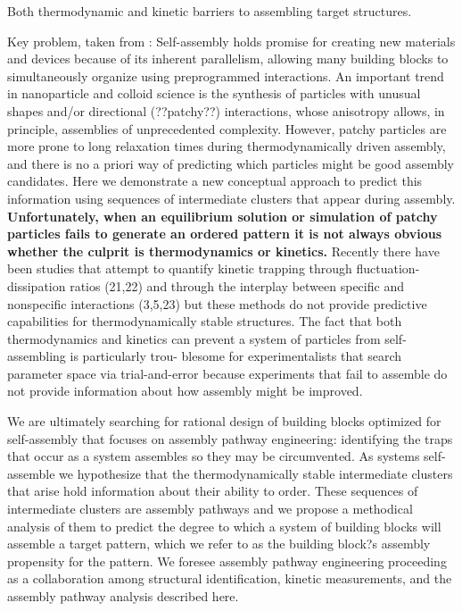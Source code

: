 
Both thermodynamic and kinetic barriers to assembling target structures.

Key problem, taken from \cite{Jankowski_2012_SoftMatter}:
Self-assembly holds promise for creating new materials and devices because of its inherent parallelism, allowing many building blocks to simultaneously organize using preprogrammed interactions.
An important trend in nanoparticle and colloid science is the synthesis of particles with unusual shapes and/or directional (??patchy??) interactions, whose anisotropy allows, in principle, assemblies of unprecedented complexity.
However, patchy particles are more prone to long relaxation times during thermodynamically driven assembly, and there is no a priori way of predicting which particles might be good assembly candidates. 
Here we demonstrate a new conceptual approach to predict this information using sequences of intermediate clusters that appear during assembly.
\textbf{Unfortunately, when an equilibrium solution or simulation of patchy particles fails to generate an ordered pattern it is not always obvious whether the culprit is thermodynamics or kinetics.}
Recently there have been studies that attempt to quantify kinetic trapping through fluctuation-dissipation ratios (21,22) and through the interplay between specific and nonspecific interactions (3,5,23) but these methods do not provide predictive capabilities for thermodynamically stable structures.
The fact that both thermodynamics and kinetics can prevent a system of particles from self-assembling is particularly trou- blesome for experimentalists that search parameter space via trial-and-error because experiments that fail to assemble do not provide information about how assembly might be improved.


We are ultimately searching for rational design of building blocks optimized for self-assembly that focuses on assembly pathway engineering: identifying the traps that occur as a system assembles so they may be circumvented.
As systems self-assemble we hypothesize that the thermodynamically stable intermediate clusters that arise hold information about their ability to order. 
These sequences of intermediate clusters are assembly pathways and we propose a methodical analysis of them to predict the degree to which a system of building blocks will assemble a target pattern, which we refer to as the building block?s assembly propensity for the pattern.
We foresee assembly pathway engineering proceeding as a collaboration among structural identification, kinetic measurements, and the assembly pathway analysis described here. \cite{Jankowski_2012_SoftMatter}

